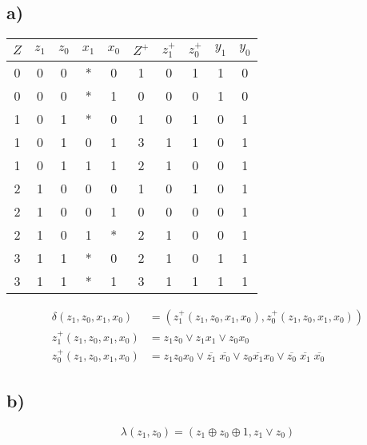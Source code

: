 \documentclass[a4paper]{scrartcl}
\begin{document}
	\subsection{a)}
		\begin{center}
			\begin{tabular}{|c|c|c||c|c||c|c|c||c|c|}
	        	\hline
	            $Z$ & $z_1$ & $z_0$ & $x_1$ & $x_0$ & $Z^+$ & $z^+_1$ & $z^+_0$ & $y_1$ & $y_0$ \\
	            \hline
	            0 & 0 & 0 & * & 0 & 1 & 0 & 1 & 1 & 0 \\
	            0 & 0 & 0 & * & 1 & 0 & 0 & 0 & 1 & 0 \\
	            1 & 0 & 1 & * & 0 & 1 & 0 & 1 & 0 & 1 \\
	            1 & 0 & 1 & 0 & 1 & 3 & 1 & 1 & 0 & 1 \\
	            1 & 0 & 1 & 1 & 1 & 2 & 1 & 0 & 0 & 1 \\
	            2 & 1 & 0 & 0 & 0 & 1 & 0 & 1 & 0 & 1 \\
	            2 & 1 & 0 & 0 & 1 & 0 & 0 & 0 & 0 & 1 \\
	            2 & 1 & 0 & 1 & * & 2 & 1 & 0 & 0 & 1 \\
	            3 & 1 & 1 & * & 0 & 2 & 1 & 0 & 1 & 1 \\
	            3 & 1 & 1 & * & 1 & 3 & 1 & 1 & 1 & 1 \\ \hline
	     	\end{tabular}
		\end{center}
		\begin{align}
			\delta(z_1, z_0, x_1, x_0) &= (z^+_1(z_1, z_0, x_1, x_0), z^+_0(z_1, z_0, x_1, x_0)) \\
			z^+_1(z_1, z_0, x_1, x_0) &= z_1z_0 \vee z_1x_1 \vee z_0x_0 \\
			z^+_0(z_1, z_0, x_1, x_0) &= z_1z_0x_0 \vee \overline{z_1}\;\overline{x_0} \vee
			z_0\overline{x_1}x_0 \vee \overline{z_0}\;\overline{x_1}\;\overline{x_0}
		\end{align}
		
	\subsection{b)}
		\[\lambda(z_1, z_0) = (z_1 \oplus z_0 \oplus 1, z_1 \vee z_0)\]
		
\end{document}
